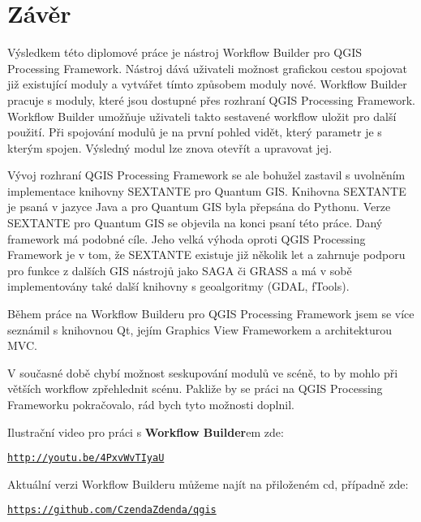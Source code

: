 \chapter*{Závěr}
Výsledkem této diplomové práce je nástroj Workflow Builder pro QGIS
Processing Framework. Nástroj dává uživateli možnost grafickou cestou
spojovat již existující moduly a vytvářet tímto způsobem moduly
nové. Workflow Builder pracuje s moduly, které jsou dostupné přes
rozhraní QGIS Processing Framework. Workflow Builder umožňuje
uživateli takto sestavené workflow uložit pro další použití. Při
spojování modulů je na první pohled vidět, který parametr je s kterým
spojen. Výsledný modul lze znova otevřít a upravovat jej.

Vývoj rozhraní QGIS Processing Framework se ale bohužel zastavil s
uvolněním implementace knihovny SEXTANTE pro Quantum GIS. Knihovna
SEXTANTE je psaná v jazyce Java a pro Quantum GIS byla přepsána do
Pythonu. Verze {SEXTANTE} pro Quantum GIS se objevila
na konci psaní této práce. Daný framework má podobné cíle. Jeho velká
výhoda oproti QGIS Processing Framework je v tom, že SEXTANTE existuje
již několik let a zahrnuje podporu pro funkce z dalších GIS nástrojů
jako SAGA či GRASS a má v sobě implementovány také další knihovny s
geoalgoritmy (GDAL, fTools).

Během práce na Workflow Builderu pro QGIS Processing Framework jsem se
více seznámil s knihovnou Qt, jejím Graphics View Frameworkem a
architekturou MVC.

V současné době chybí možnost seskupování modulů ve scéně, to by mohlo
při větších workflow zpřehlednit scénu. Pakliže by se práci na QGIS
Processing Frameworku pokračovalo, rád bych tyto možnosti doplnil.

Ilustrační video pro práci s \textbf{Workflow Builder}em zde:

\begin{center}
	\href{http://youtu.be/4PxvWvTIyaU}{\texttt{http://youtu.be/4PxvWvTIyaU}}
\end{center}
 
\newpage
Aktuální verzi Workflow Builderu můžeme najít na přiloženém cd, případně zde:

\begin{center}
	\href{https://github.com/CzendaZdenda/qgis}{\texttt{https://github.com/CzendaZdenda/qgis}}
\end{center}

